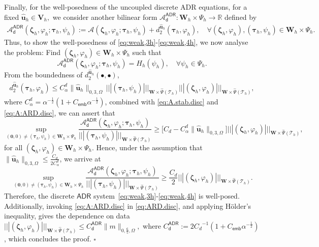 \documentclass[10pt,a4paper]{amsart}
\newcommand{\bV}{\mathbf{V}}
\newcommand{\bW}{\mathbf{W}}
\newcommand\btau{\boldsymbol{\tau}}
\newcommand{\bu}{\boldsymbol{u}}
\newcommand\bzero{\boldsymbol{0}}
\newcommand\bzeta{\boldsymbol{\zeta}}
\newcommand{\cT}{\mathcal{T}}
\newenvironment{proof}{\noindent{\it Proof.}}{\hfill$\square$}
\newcommand*\tnorm[1]{|\!|\!| #1 |\!|\!|}
\begin{document}
\begin{proof}
Finally, for the well-posedness of the uncoupled discrete ADR equations, for a fixed \(\hat{\bu}_h\in\bV_h,\) we consider another bilinear form \(\mathcal{A}^{\mathsf{ADR}}_{\mathsf{d}}:\bW_h\times\Psi_h\to \mathbb{R}\) defined by 
\begin{align}\label{eq:A:ARD.disc}\mathcal{A}_{\mathsf{d}}^{\mathsf{ADR}}(\bzeta_h,\varphi_h;\btau_h,\psi_h):=\mathcal{A}(\bzeta_h,\varphi_h;\btau_h,\psi_h)+d_2^{\hat{\bu}_h}(\btau_h,\varphi_h),\quad \forall (\bzeta_h,\varphi_h), (\btau_h,\psi_h)\in\bW_h\times \Psi_h.\end{align}
Thus,  to show the well-posedness of \eqref{eq:weak,3h}-\eqref{eq:weak,4h}, we now analyse  the problem: Find \((\bzeta_h,\varphi_h)\in\bW_h\times \Psi_h\) such that \[\mathcal{A}_{\mathsf{d}}^{\mathsf{ADR}}(\bzeta_h,\varphi_h;\btau_h,\psi_h)=H_h(\psi_h),\quad \forall \psi_h\in \Psi_h.\] 
From the boundedness of \(d_2^{\hat{\bu}_h}(\bullet,\bullet)\),{\begin{align}\label{eq:d2.bound.disc}d_2^{\hat{\bu}_h}(\btau_h,\varphi_h)\leq C^d_{\alpha}\|\hat{\bu}_h\|_{0,3,\Omega}\,\tnorm{(\btau_h,\psi_h)}_{\bW\times\widehat{\Psi}(\cT_h)}\tnorm{(\bzeta_h,\varphi_h)}_{\bW\times\widehat{\Psi}(\cT_h)},\end{align}} 
{where $C^d_{\alpha}=\alpha^{-\frac12}(1+{C_{\mathsf{emb}}}\alpha^{-\frac12})$}, combined with \eqref{eq:A.stab.disc} and \eqref{eq:A:ARD.disc}, we can assert that
\[\sup_{(\bzero,0)\neq(\btau_h,\psi_h)\in {\bW_h\times\Psi_h}}\frac{\mathcal{A}_{\mathsf{d}}^{\mathsf{ADR}}(\bzeta_h,\varphi_h;\btau_h,\psi_h)}{\tnorm{(\btau_h,{\psi_h})}_{\bW\times\widehat{\Psi}(\cT_h)}}\geq\bigl[C_d-C^d_{\alpha}\|\hat{\bu}_h\|_{0,3,\Omega}\bigr]\tnorm{(\bzeta_h,\varphi_h)}_ {\bW\times\widehat{\Psi}(\cT_h)}, \]
for all \((\bzeta_h,\varphi_h)\in \bW_h\times \Psi_h.\) Hence, {under the assumption that  
$\|\hat{\bu}_h\|_{0,3,\Omega}\leq \frac{C_d}{2C^d_{\alpha}}$, we} arrive at 
\begin{equation}\label{eq:ARD.disc}
\sup_{(\bzero,0)\neq(\btau_h,\psi_h)\in {\bW_h\times\Psi_h}}\frac{\mathcal{A}_{\mathsf{d}}^{\mathsf{ADR}}(\bzeta_h,\varphi_h;\btau_h,\psi_h)}{\tnorm{(\btau_h,\psi_h)}_ {\bW\times\widehat{\Psi}(\cT_h)}}\geq\frac{C_d}{2} \tnorm{(\bzeta_h,\varphi_h)}_ {\bW\times \widehat{\Psi}(\cT_h)}.
\end{equation}
Therefore, the discrete $\mathsf{ADR}$ system~\eqref{eq:weak,3h}-\eqref{eq:weak,4h} is well-posed. 
Additionally, invoking \eqref{eq:A:ARD.disc} in \eqref{eq:ARD.disc}, and  applying H\"{o}lder's inequality, 
gives the dependence on data {\(\tnorm{(\bzeta_h,\varphi_h)}_{\bW\times\widehat{\Psi}(\cT_h)}\leq C^{\mathsf{ADR}}_{\mathsf{d}}\|m\|_{0,\frac65,\Omega},\)} where {\(C^{\mathsf{ADR}}_{\mathsf{d}}:={2}{C_d}^{-1}(1+C_{\mathsf{emb}}\alpha^{-\frac12})\)}, which concludes the proof. 
\end{proof}
\end{document}
